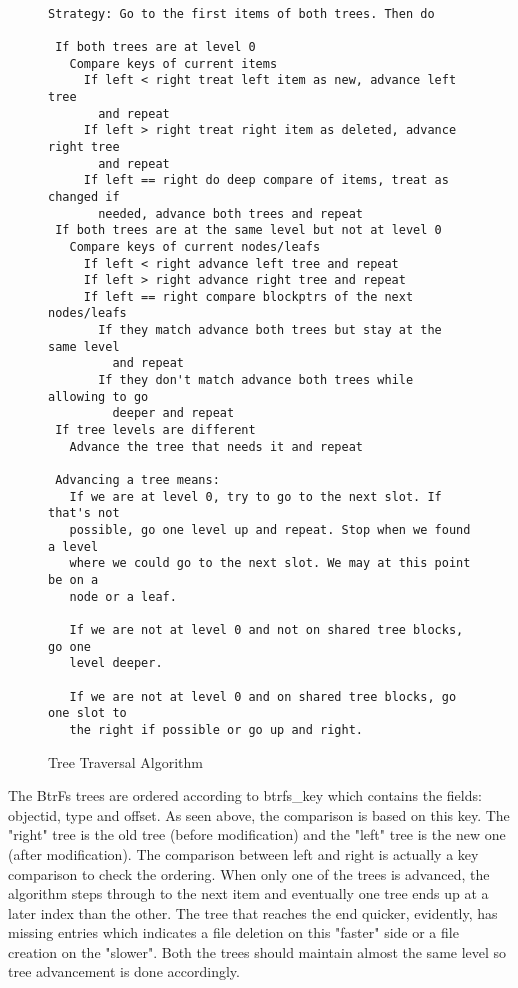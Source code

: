 \documentclass[final]{ols}
\begin{document}
\begin{figure*}[htb]
\begin{shaded}
\begin{center}
\begin{small}
\begin{verbatim}

Strategy: Go to the first items of both trees. Then do

 If both trees are at level 0
   Compare keys of current items
     If left < right treat left item as new, advance left tree
       and repeat
     If left > right treat right item as deleted, advance right tree
       and repeat
     If left == right do deep compare of items, treat as changed if
       needed, advance both trees and repeat
 If both trees are at the same level but not at level 0
   Compare keys of current nodes/leafs
     If left < right advance left tree and repeat
     If left > right advance right tree and repeat
     If left == right compare blockptrs of the next nodes/leafs
       If they match advance both trees but stay at the same level
         and repeat
       If they don't match advance both trees while allowing to go
         deeper and repeat
 If tree levels are different
   Advance the tree that needs it and repeat

 Advancing a tree means:
   If we are at level 0, try to go to the next slot. If that's not
   possible, go one level up and repeat. Stop when we found a level
   where we could go to the next slot. We may at this point be on a
   node or a leaf.

   If we are not at level 0 and not on shared tree blocks, go one
   level deeper.

   If we are not at level 0 and on shared tree blocks, go one slot to
   the right if possible or go up and right.

\end{verbatim}
\end{small}
\caption{Tree Traversal Algorithm}
\label{lockhart-treeTraversalAlgo}
\end{center}
\end{shaded}
\end{figure*}

The BtrFs trees are ordered according to btrfs\_key which contains the fields: objectid, type and offset. As seen above, the comparison is based on this key. The "right" tree is the old tree (before modification) and the "left" tree is the new one (after modification). The comparison between left and right is actually a key comparison to check the ordering. When only one of the trees is advanced, the algorithm steps through to the next item and eventually one tree ends up at a later index than the other. The tree that reaches the end quicker, evidently, has missing entries which indicates a file deletion on this "faster" side or a file creation on the "slower".  Both the trees should maintain almost the same level so tree advancement is done accordingly.
\end{document}

